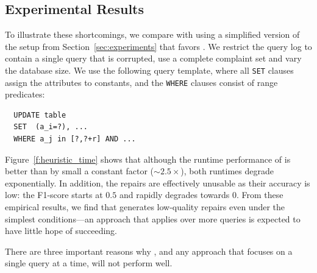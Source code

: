 \subsection{Experimental Results}

To illustrate these shortcomings, we compare \dt with \sys using a simplified version of the setup from Section~\ref{sec:experiments} that favors \dt.
We restrict the query log to contain a single query that is corrupted, use a complete complaint set  and vary the database size.
We use the following query template, where all \texttt{SET} clauses assign the attributes to constants,
and the \texttt{WHERE} clauses consist of range predicates:

{\scriptsize
\begin{verbatim}
  UPDATE table
  SET  (a_i=?), ...
  WHERE a_j in [?,?+r] AND ...
\end{verbatim}
}

Figure~\ref{f:heuristic_time} shows that although the runtime performance of \dt is better than \sys by small a constant factor ($\sim 2.5 \times$),
both runtimes degrade exponentially.
In addition, the \dt repairs are effectively unusable as their accuracy is low: the F1-score starts at $0.5$ and rapidly degrades towards $0$.
From these empirical results, we find that \dt generates low-quality repairs even under the simplest conditions---an approach
that applies \dt over more queries is expected to have little hope of succeeding.



There are three important reasons why \dt, and any approach that focuses on a single query at a 
time, will not perform well.

